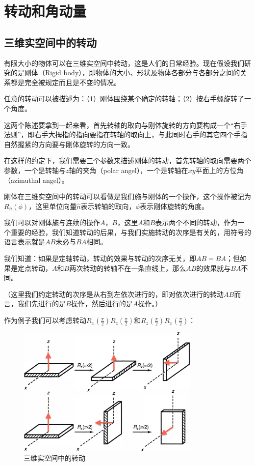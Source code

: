 \section{转动和角动量}

\subsection{三维实空间中的转动}

有限大小的物体可以在三维实空间中转动，这是人们的日常经验。现在假设我们研究的是刚体（Rigid body），即物体的大小、形状及物体各部分与各部分之间的关系都是完全被规定而且是不变的情况。

任意的转动可以被描述为：（1）刚体围绕某个确定的转轴；（2）按右手螺旋转了一个角度。

这两个陈述要拿到一起来看，首先转轴的取向与刚体旋转的方向要构成一个“右手法则”，即右手大拇指的指向要指在转轴的取向上，与此同时右手的其它四个手指自然握紧的方向要与刚体旋转的方向一致。

在这样的约定下，我们需要三个参数来描述刚体的转动，首先转轴的取向需要两个参数，一个是转轴与$z$轴的夹角（polar angel），一个是转轴在$xy$平面上的方位角（azimuthal angel）。

刚体在三维实空间中的转动可以看做是我们施与刚体的一个操作，这个操作被记为$R_{\hat n}(\phi)$，这里单位向量$\hat n$表示转轴的取向，$\phi$表示刚体旋转的角度。

我们可以对刚体施与连续的操作$A$，$B$，这里$A$和$B$表示两个不同的转动，作为一个重要的经验，我们知道转动的后果，与我们实施转动的次序是有关的，用符号的语言表示就是$AB$未必与$BA$相同。

我们知道：如果是定轴转动，转动的效果与转动的次序无关，即$AB = BA$；但如果是定点转动，$A$和$B$两次转动的转轴不在一条直线上，那么$AB$的效果就与$BA$不同。

（这里我们约定转动的次序是从右到左依次进行的，即对依次进行的转动$AB$而言，我们先进行的是$B$操作，然后进行的是$A$操作。）

作为例子我们可以考虑转动$R_x(\frac{\pi}{2})R_z(\frac{\pi}{2})$和$R_z(\frac{\pi}{2})R_x(\frac{\pi}{2})$：

\begin{figure}[htbp]
\begin{center}
\includegraphics[width=9cm]{AngularMomentum/Rotation.png}
\caption{三维实空间中的转动}
\end{center}
\end{figure}


